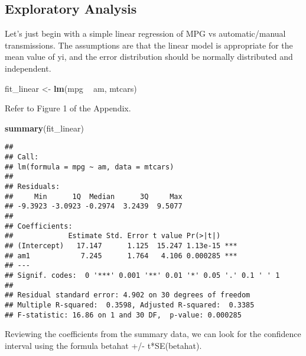 \documentclass[]{article}
\newenvironment{Shaded}{\begin{snugshade}}{\end{snugshade}}
\newcommand{\KeywordTok}[1]{\textcolor[rgb]{0.13,0.29,0.53}{\textbf{#1}}}
\newcommand{\DataTypeTok}[1]{\textcolor[rgb]{0.13,0.29,0.53}{#1}}
\newcommand{\DecValTok}[1]{\textcolor[rgb]{0.00,0.00,0.81}{#1}}
\newcommand{\FloatTok}[1]{\textcolor[rgb]{0.00,0.00,0.81}{#1}}
\newcommand{\StringTok}[1]{\textcolor[rgb]{0.31,0.60,0.02}{#1}}
\newcommand{\OperatorTok}[1]{\textcolor[rgb]{0.81,0.36,0.00}{\textbf{#1}}}
\newcommand{\NormalTok}[1]{#1}
\begin{document}
\subsection{Exploratory Analysis}\label{exploratory-analysis}

Let's just begin with a simple linear regression of MPG vs
automatic/manual transmissions. The assumptions are that the linear
model is appropriate for the mean value of yi, and the error
distribution should be normally distributed and independent.

\begin{Shaded}
\begin{Highlighting}[]
\NormalTok{fit_linear <-}\StringTok{ }\KeywordTok{lm}\NormalTok{(mpg }\OperatorTok{~}\StringTok{ }\NormalTok{am, mtcars)}
\end{Highlighting}
\end{Shaded}

Refer to Figure 1 of the Appendix.

\begin{Shaded}
\begin{Highlighting}[]
\KeywordTok{summary}\NormalTok{(fit_linear)}
\end{Highlighting}
\end{Shaded}

\begin{verbatim}
## 
## Call:
## lm(formula = mpg ~ am, data = mtcars)
## 
## Residuals:
##     Min      1Q  Median      3Q     Max 
## -9.3923 -3.0923 -0.2974  3.2439  9.5077 
## 
## Coefficients:
##             Estimate Std. Error t value Pr(>|t|)    
## (Intercept)   17.147      1.125  15.247 1.13e-15 ***
## am1            7.245      1.764   4.106 0.000285 ***
## ---
## Signif. codes:  0 '***' 0.001 '**' 0.01 '*' 0.05 '.' 0.1 ' ' 1
## 
## Residual standard error: 4.902 on 30 degrees of freedom
## Multiple R-squared:  0.3598, Adjusted R-squared:  0.3385 
## F-statistic: 16.86 on 1 and 30 DF,  p-value: 0.000285
\end{verbatim}

Reviewing the coefficients from the summary data, we can look for the
confidence interval using the formula betahat +/- t*SE(betahat).

\begin{Shaded}
\end{Shaded}
\end{document}
